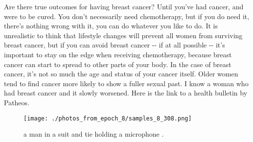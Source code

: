 \documentclass{article}%
\begin{document}
Are there true outcomes for having breast cancer?\newline%
Until you've had cancer, and were to be cured. You don't necessarily need chemotherapy, but if you do need it, there's nothing wrong with it, you can do whatever you like to do. It is unrealistic to think that lifestyle changes will prevent all women from surviving breast cancer, but if you can avoid breast cancer {-}{-} if at all possible {-}{-} it’s important to stay on the edge when receiving chemotherapy, because breast cancer can start to spread to other parts of your body.\newline%
In the case of breast cancer, it’s not so much the age and status of your cancer itself. Older women tend to find cancer more likely to show a fuller sexual past.\newline%
I know a woman who had breast cancer and it slowly worsened. Here is the link to a health bulletin by Patheos.\newline%

%


\begin{figure}[h!]%
\centering%
\texttt{[image: ./photos\_from\_epoch\_8/samples\_8\_308.png]}%
\caption{a man in a suit and tie holding a microphone .}%
\end{figure}

%
\end{document}
